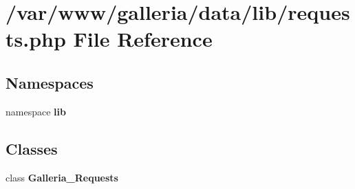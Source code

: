 \section{/var/www/galleria/data/lib/requests.php File Reference}
\label{requests_8php}
\subsection*{Namespaces}
\begin{CompactItemize}
\item 
namespace {\bf lib}
\end{CompactItemize}
\subsection*{Classes}
\begin{CompactItemize}
\item 
class {\bf Galleria\_\-Requests}
\end{CompactItemize}
